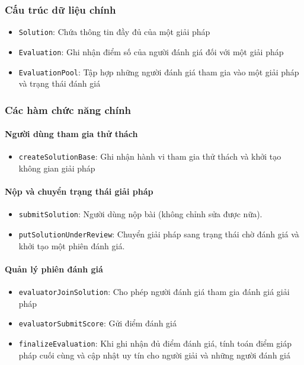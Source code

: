 \subsubsection{Cấu trúc dữ liệu chính}

\begin{itemize}
  \item \texttt{Solution}: Chứa thông tin đầy đủ của một giải pháp
  \item \texttt{Evaluation}: Ghi nhận điểm số của người đánh giá đối với một giải pháp
  \item \texttt{EvaluationPool}: Tập hợp những người đánh giá tham gia vào một giải pháp và trạng thái đánh giá
\end{itemize}

\subsubsection{Các hàm chức năng chính}

\paragraph{Người dùng tham gia thử thách}

\begin{itemize}
  \item \texttt{createSolutionBase}: Ghi nhận hành vi tham gia thử thách và khởi tạo không gian giải pháp
\end{itemize}

\paragraph{Nộp và chuyển trạng thái giải pháp}

\begin{itemize}
  \item \texttt{submitSolution}: Người dùng nộp bài (không chỉnh sửa được nữa).
  \item \texttt{putSolutionUnderReview}: Chuyển giải pháp sang trạng thái chờ đánh giá và khởi tạo một phiên đánh giá.
\end{itemize}

\paragraph{Quản lý phiên đánh giá}

\begin{itemize}
  \item \texttt{evaluatorJoinSolution}: Cho phép người đánh giá tham gia đánh giá giải pháp
  \item \texttt{evaluatorSubmitScore}: Gửi điểm đánh giá
  \item \texttt{finalizeEvaluation}: Khi ghi nhận đủ điểm đánh giá, tính toán điểm giáp pháp cuối cùng và cập nhật uy tín cho người giải và những người đánh giá
\end{itemize}

